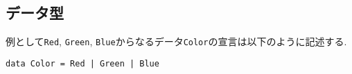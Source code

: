 \subsection{データ型}
例として\verb|Red|, \verb|Green|, \verb|Blue|からなるデータ\verb|Color|の宣言は以下のように記述する.
\begin{lstlisting}
data Color = Red | Green | Blue 
\end{lstlisting}
\begin{comment}
データを表示するためには, \verb|Color| を型クラス \verb|Show| のインスタンスにする必要があることに注意する.
\begin{lstlisting}
data Color = Red | Green | Blue deriving Show
\end{lstlisting}
\end{comment}
\begin{comment}
\subsection{型クラス}
\begin{lstlisting}
class Foo a where
    foo :: a -> String
instance Foo Bool where
    foo True = "Bool: True"
    foo False = "Bool: False"
instance Foo Int where
    foo x = "Int: " ++ show x
instance Foo Char where
    foo x = "Char: " ++ [x]

main = do
    putStrLn $ foo True		-- Bool: True
    putStrLn $ foo (123::Int)	-- Int: 123
    putStrLn $ foo 'A'		-- Char: A
\end{lstlisting}
Foo 型クラスは任意の型(a)を受け取り、Stringを返却するメソッド foo を持っている. instance を用いてそれぞれの型が引数に指定された場合の処理を実装している.
\subsection{型構築子}
また, 一つ以上の具体的な型に対して, 型構築子を適用すると新しい型を構築できる.
Maybe の定義は,
\begin{lstlisting}
data Maybe a = Nothing | Just a
data Maybe a = Nothing | Just a         
instance Eq a => Eq (Maybe a) 
instance Monad Maybe 
instance Functor Maybe 
instance Ord a => Ord (Maybe a) 
instance Read a => Read (Maybe a) 
instance Show a => Show (Maybe a) 
instance Applicative Maybe 
instance Foldable Maybe 
instance Traversable Maybe 
instance Monoid a => Monoid (Maybe a) 
\end{lstlisting}
Maybe は型構築子で Nothing および Just はデータ構築子です。
\end{comment}

